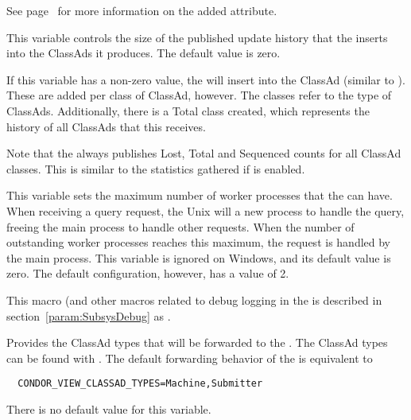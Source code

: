 \begin{description}
  See page~\pageref{sec:Collector-Added-Attributes} for more information on the
  added attribute.


\label{param:CollectorClassHistorySize}
\item[\Macro{COLLECTOR\_CLASS\_HISTORY\_SIZE}]
  This variable controls the
  size of the published update history that the  inserts into
  the  ClassAds it produces.  
  The default value is zero.

  If this variable has a non-zero value, the  will insert
   into the  ClassAd 
  (similar to ).  
  These are added per class of ClassAd, however.  
  The classes refer to the type of ClassAds.
  Additionally, there is a Total class created,
  which represents the history of all ClassAds that this 
  receives.

  Note that the  always publishes Lost, Total and Sequenced
  counts for all ClassAd classes.  This is similar to the
  statistics gathered if  is enabled.

\label{param:CollectorQueryWorkers}
\item[\Macro{COLLECTOR\_QUERY\_WORKERS}]
  This variable sets the maximum
  number of worker processes that the  can have.  
  When receiving a query request, 
  the Unix  will  a new
  process to handle the query, freeing the main process to handle
  other requests.  When the number of outstanding worker processes
  reaches this maximum, the request is handled by the main process.
  This variable is ignored on Windows, and its default value is zero.
  The default configuration, however, has a value of 2.

\label{param:CollectorDebug}
\item[\Macro{COLLECTOR\_DEBUG}]
  This macro (and other macros related to debug logging in the 
  is described in section~\ref{param:SubsysDebug} as
  .

\label{param:CondorViewClassadTypes}
\item[\Macro{CONDOR\_VIEW\_CLASSAD\_TYPES}]
  Provides the ClassAd types that will be forwarded to the
  . The ClassAd types can be found with 
   . The default forwarding behavior of the 
   is equivalent to 
\begin{verbatim}
  CONDOR_VIEW_CLASSAD_TYPES=Machine,Submitter
\end{verbatim} 
  There is no default value for this variable.

\end{description}

